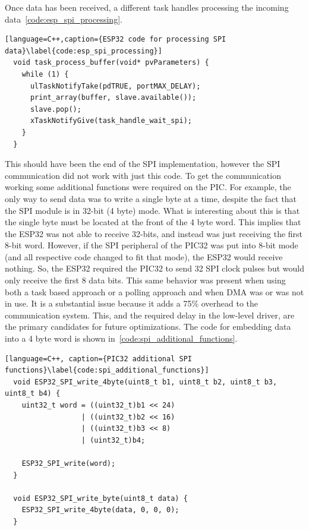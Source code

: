 Once data has been received, a different task handles processing the incoming data~\autoref{code:esp_spi_processing}.

\begin{lstlisting}[language=C++,caption={ESP32 code for processing SPI data}\label{code:esp_spi_processing}]
  void task_process_buffer(void* pvParameters) {
    while (1) {
      ulTaskNotifyTake(pdTRUE, portMAX_DELAY);
      print_array(buffer, slave.available());
      slave.pop();
      xTaskNotifyGive(task_handle_wait_spi);
    }
  }
\end{lstlisting}

This should have been the end of the SPI implementation,
however the SPI communication did not work with just this code.
To get the communication working some additional functions were required on the PIC.
For example, the only way to send data was to write a single byte at a time, despite the fact that the SPI module is in 32-bit (4 byte) mode.
What is interesting about this is that the single byte must be located at the front of the 4 byte word.
This implies that the ESP32 was not able to receive 32-bits, and instead was just receiving the first 8-bit word.
However, if the SPI peripheral of the PIC32 was put into 8-bit mode (and all respective code changed to fit that mode),
the ESP32 would receive nothing.
So, the ESP32 required the PIC32 to send 32 SPI clock pulses but would only receive the first 8 data bits.
This same behavior was present when using both a task based approach or a polling approach and when DMA was or was not in use.
It is a substantial issue because it adds a 75\% overhead to the communication system.
This, and the required delay in the low-level driver, are the primary candidates for future optimizations.
The code for embedding data into a 4 byte word is shown in~\autoref{code:spi_additional_functions}.

\begin{lstlisting}[language=C++, caption={PIC32 additional SPI functions}\label{code:spi_additional_functions}]
  void ESP32_SPI_write_4byte(uint8_t b1, uint8_t b2, uint8_t b3, uint8_t b4) {
    uint32_t word = ((uint32_t)b1 << 24)
                  | ((uint32_t)b2 << 16)
                  | ((uint32_t)b3 << 8)
                  | (uint32_t)b4;

    ESP32_SPI_write(word);
  }

  void ESP32_SPI_write_byte(uint8_t data) {
    ESP32_SPI_write_4byte(data, 0, 0, 0);
  }
\end{lstlisting}

